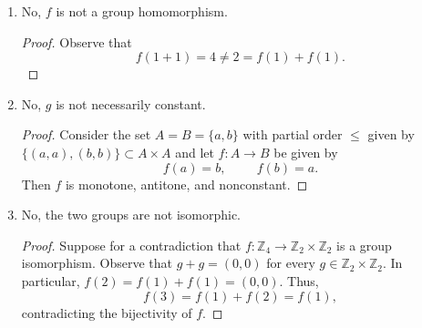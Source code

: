 \documentclass{article}
\newcommand{\Z}{\mathbb{Z}}
\begin{document}
\begin{enumerate}
\begin{proof}
			It remains to show that $\phi$ is surjective. Let $f:\Z\to\Z$ be an order isomorphism and put $n=f(0)$. Since $f$ establishes a bijection between $\{0<\cdots<k\}$ and $\{f(0)<\cdots<f(k)\}$, it follows that $k\leq f(k)-f(0)$. Similarly, as $f^{-1}$ maps $\{f(0)<\cdots<f(k)\}$ bijectively onto $\{0<\cdots<k\}$, we infer that $f(k)-f(0)\leq k$. Thus,
			\[
				f(k)=f(0)+k = n+k
			\]
			and we conclude that $f=f_n=\phi(n)$.
		\end{proof}
	\item No, $f$ is not a group homomorphism.
		\begin{proof}
			Observe that
			\[
				f(1+1) = 4 \neq 2 = f(1) + f(1).
			\]
		\end{proof}
	\item No, $g$ is not necessarily constant.
		\begin{proof}
			Consider the set $A=B=\{a,b\}$ with partial order $\leq$ given by $\{(a,a),(b,b)\}\subset A\times A$ and let $f:A\to B$ be given by
			\[
				f(a) = b,\hspace{1cm}f(b)=a.
			\]
			Then $f$ is monotone, antitone, and nonconstant.
		\end{proof}
	\item No, the two groups are not isomorphic.
		\begin{proof}
			Suppose for a contradiction that $f:\Z_4\to\Z_2\times\Z_2$ is a group isomorphism. Observe that $g+g=(0,0)$ for every $g\in \Z_2\times\Z_2$. In particular, $f(2)=f(1)+f(1)=(0,0)$. Thus,
			\[
				f(3) = f(1) + f(2) = f(1),
			\]
			contradicting the bijectivity of $f$.
		\end{proof}
\end{enumerate}
\end{document}
